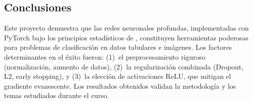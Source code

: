 \documentclass[12pt, a4paper]{article}
\begin{document}
\subsection{Conclusiones}

Este proyecto demuestra que las redes neuronales profundas,
implementadas con PyTorch bajo los principios estadísticos de
\citet{islp2023}, constituyen herramientas poderosas para problemas
de clasificación en datos tabulares e imágenes. Los factores
determinantes en el éxito fueron: (1)~el preprocesamiento riguroso
(normalización, aumento de datos), (2)~la regularización combinada
(Dropout, L2, early stopping), y (3)~la elección de activaciones ReLU,
que mitigan el gradiente evanescente. Los resultados obtenidos validan
la metodología y los temas estudiados durante el curso.

\newpage

\end{document}
